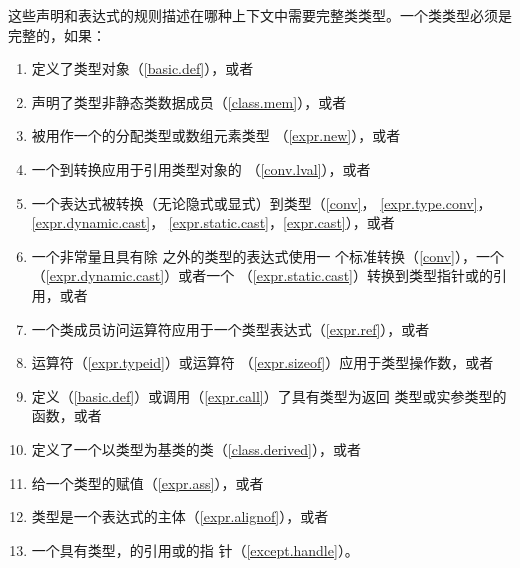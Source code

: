 \begin{note} %
  这些声明和表达式的规则描述在哪种上下文中需要完整类类型。一个类类型必须是
  完整的，如果：
  \begin{enumerate}
    \item 定义了类型对象（\ref{basic.def}），或者
    \item 声明了类型非静态类数据成员（\ref{class.mem}），或者
    \item {}被用作一个的分配类型或数组元素类型
          （\ref{expr.new}），或者
    \item 一个\lvalue{}到\rvalue{}转换应用于引用类型对象的\glvalue{}
          （\ref{conv.lval}），或者
    \item 一个表达式被转换（无论隐式或显式）到类型（\ref{conv}，
          \ref{expr.type.conv}，\ref{expr.dynamic.cast}，
          \ref{expr.static.cast}，\ref{expr.cast}），或者
    \item 一个非\nullp{}常量且具有除 之外的类型的表达式使用一
          个标准转换（\ref{conv}），一个
          （\ref{expr.dynamic.cast}）或者一个
          （\ref{expr.static.cast}）转换到类型指针或的引用，或者
    \item 一个类成员访问运算符应用于一个类型表达式（\ref{expr.ref}），或者
    \item {}运算符（\ref{expr.typeid}）或运算符
          （\ref{expr.sizeof}）应用于类型操作数，或者
    \item 定义（\ref{basic.def}）或调用（\ref{expr.call}）了具有类型为返回
          类型或实参类型的函数，或者
    \item 定义了一个以类型为基类的类（\ref{class.derived}），或者
    \item 给一个类型的\lvalue{}赋值（\ref{expr.ass}），或者
    \item 类型是一个表达式的主体（\ref{expr.alignof}），或者
    \item 一个具有类型，的引用或的指
          针（\ref{except.handle}）。
  \end{enumerate}
\end{note}

